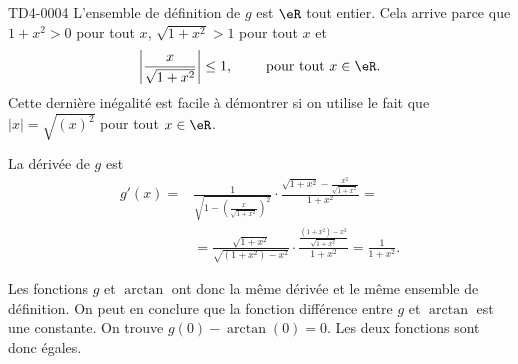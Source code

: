 

\begin{corrige}{TD4-0004}
  L'ensemble de définition de $g$ est $\eR$ tout entier. Cela arrive parce que $1+x^2 >0$ pour tout $x$, $\sqrt{1+x^2}>1$ pour tout $x$ et 
\[
\left|\frac{x}{\sqrt{1+x^2}}\right| \leq 1, \qquad \text{ pour tout } x\in\eR . 
\]
Cette dernière inégalité est facile à démontrer si on utilise le fait que $|x| = \sqrt{(x)^2}$ pour tout $x\in\eR$.

La dérivée de $g$ est 
\begin{equation*}
  \begin{aligned}
    g' (x) = &\frac{1}{\sqrt{1-\left(\frac{x}{\sqrt{1+x^2}}\right)^2}} \cdot \frac{\sqrt{1+x^2} -\frac{x^2}{\sqrt{1+x^2}}}{1+x^2} = \\
    &= \frac{\sqrt{1+x^2}}{\sqrt{(1+x^2)-x^2}}\cdot\frac{\frac{(1+x^2) -x^2}{\sqrt{1+x^2}}}{1+x^2} =\frac{1}{1+x^2}.
  \end{aligned}
\end{equation*}

Les fonctions $g$  et $\arctan$ ont donc la m\^eme dérivée et le m\^eme ensemble de définition. On peut en conclure que la fonction différence entre $g$ et $\arctan$  est une constante.  On trouve $g(0)-\arctan(0) = 0$. Les deux fonctions sont donc égales. 
 
\end{corrige}

